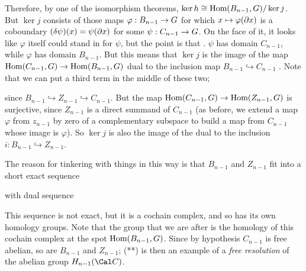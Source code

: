 \vfill
\eject


\ssk

Therefore, by one of the isomorphism theorems, $\ker h \cong \text{Hom}(B_{n-1},G)/\ker j$.
But $\ker j$ consists of those maps $\varphi:B_{n-1}\rightarrow G$ for which $x\mapsto \varphi(\partial x)$ is a
coboundary $(\delta\psi)(x) = \psi(\partial x)$ for
some $\psi:C_{n-1}\rightarrow G$. On the face of it, it looks like $\varphi$
itself could stand in for $\psi$, but the point is that 
.
$\psi$ has domain $C_{n-1}$, while $\varphi$ has domain $B_{n-1}$. 
But this means that $\ker j$ is the image of the map 
$\text{Hom}(C_{n-1},G)\rightarrow \text{Hom}(B_{n-1},G)$ dual to the inclusion map 
$B_{n-1}\hookrightarrow C_{n-1}$ . Note that we can put a third term in the middle of these
two; 


since $B_{n-1}\hookrightarrow Z_{n-1}\hookrightarrow C_{n-1}$. But the map
$\text{Hom}(C_{n-1},G)\rightarrow \text{Hom}(Z_{n-1},G)$ is surjective, since $Z_{n-1}$ is a direct summand 
of $C_{n-1}$ (as before, we extend a map $\varphi$ from $z_{n-1}$ by zero of a complementary subspace
to build a map from $C_{n-1}$ whose image is $\varphi$). So $\ker j$
is also the image of the dual to the inclusion $i:B_{n-1}\hookrightarrow Z_{n-1}$.

\msk

The reason for tinkering with things in this way is that $B_{n-1}$ and $Z_{n-1}$ fit into
a short exact sequence 

\ssk


\ssk

with dual sequence

\ssk


\ssk

This sequence is not exact, but it is a cochain complex, and so has its own
homology groups. Note that the group that we are after is the homology of this cochain complex
at the spot $\text{Hom}(B_{n-1},G)$. Since by hypothesis $C_{n-1}$ is free abelian, so are
$B_{n-1}$ and $Z_{n-1}$; (**) is then an example of a {\it free resolution} of the abelian
group $H_{n-1}({\Cal C})$. 

